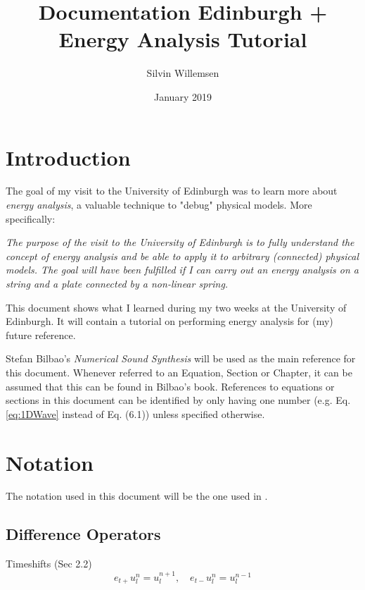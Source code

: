 \documentclass{article}
\title{Documentation Edinburgh + Energy Analysis Tutorial}
\author{Silvin Willemsen}
\date{January 2019}
\begin{document}
\maketitle

\section{Introduction}\label{sec:introduction}
The goal of my visit to the University of Edinburgh was to learn more about \textit{energy analysis}, a valuable technique to "debug" physical models. More specifically:

\begin{center}
    \textit{The purpose of the visit to the University of Edinburgh is to fully understand the concept of energy analysis and be able to apply it to arbitrary (connected) physical models. The goal will have been fulfilled if I can carry out an energy analysis on a string and a plate connected by a non-linear spring.}
\end{center}

This document shows what I learned during my two weeks at the University of Edinburgh. It will contain a tutorial on performing energy analysis for (my) future reference. 

Stefan Bilbao's \textit{Numerical Sound Synthesis} \cite{Bilbao2009} will be used as the main reference for this document. Whenever referred to an Equation, Section or Chapter, it can be assumed that this can be found in Bilbao's book. References to equations or sections in this document can be identified by only having one number (e.g. Eq. \eqref{eq:1DWave} instead of Eq. (6.1)) unless specified otherwise.


\section{Notation}\label{sec:notation} 
The notation used in this document will be the one used in \cite{Bilbao2009}. 

\subsection{Difference Operators} 
Timeshifts (Sec 2.2)
\begin{equation}
    e_{t+}u_l^n = u_l^{n+1}, \quad e_{t-}u_l^n = u_l^{n-1}
\end{equation}
\end{document}
